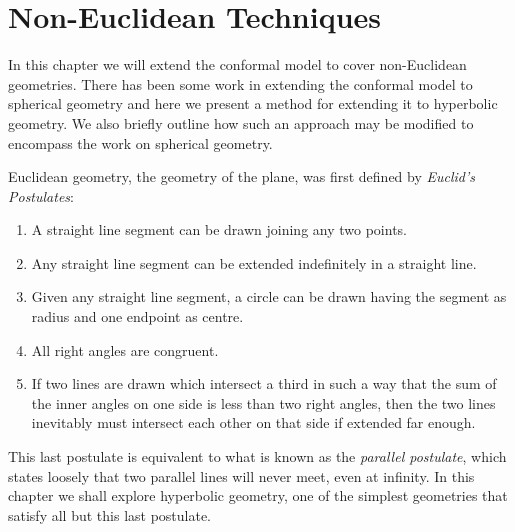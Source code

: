 \begin{savequote}
\end{savequote}

\chapter{Non-Euclidean Techniques}
\label{chap:noneuclid}

In this chapter we will extend the conformal model to cover non-Euclidean
geometries. There has been some work in extending the conformal model to 
spherical geometry\cite{GA:genhomo} and here we present a method for
extending it to hyperbolic geometry. We also briefly outline how such an
approach may be modified to encompass the work on spherical geometry.

Euclidean geometry, the geometry of the plane, was first defined\cite{Heath56} by
\emph{Euclid's Postulates}:

\begin{enumerate}
\item A straight line segment can be drawn joining any two points. 
\item Any straight line segment can be extended indefinitely in a straight line. 
\item Given any straight line segment, a circle can be drawn having the segment as radius and one endpoint as centre. 
\item All right angles are congruent. 
\item If two lines are drawn which intersect a third in such a way that the sum of the inner angles on one side is less than two right angles, then the two lines inevitably must intersect each other on that side if extended far enough.
\end{enumerate} 

This last postulate is equivalent to what is known as the \emph{parallel postulate},
which states loosely that two parallel lines will never meet, even at infinity.
In this chapter we shall explore hyperbolic geometry, one of the simplest
geometries that satisfy all but this last postulate.


